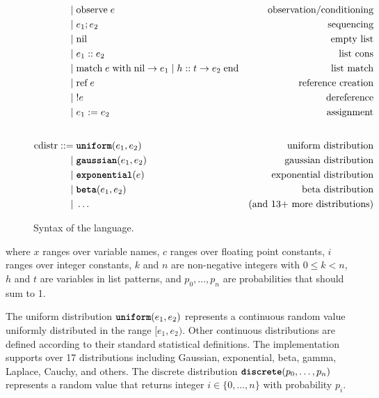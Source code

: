 \documentclass[acmsmall,screen,dvipsnames,x11names,nonacm,anonymous,review]{acmart}
\begin{document}
\begin{figure}[h]
\begin{align*}
    | &\; \text{observe}\; e              & \text{observation/conditioning} \\
    | &\; e_1; e_2                        & \text{sequencing} \\
    | &\; \text{nil}                      & \text{empty list} \\
    | &\; e_1 :: e_2                      & \text{list cons} \\
    | &\; \text{match}\; e\; \text{with}\; \text{nil} \rightarrow e_1 \mid h :: t \rightarrow e_2\; \text{end} & \text{list match} \\
    | &\; \text{ref}\; e                  & \text{reference creation} \\
    | &\; !e                              & \text{dereference} \\
    | &\; e_1 := e_2                      & \text{assignment} \\
    \\[1ex] %
\text{cdistr} ::= &\; \uniform(e_1, e_2)      & \text{uniform distribution} \\
           | &\; \gaussian(e_1, e_2)   & \text{gaussian distribution} \\
           | &\; \exponential(e)       & \text{exponential distribution} \\
           | &\; \betafn(e_1, e_2)     & \text{beta distribution} \\
           | &\; \ldots                & \text{(and 13+ more distributions)}
\end{align*}
\caption{Syntax of the \Slice{} language.}
\label{fig:grammar}
\end{figure}

\noindent where $x$ ranges over variable names, $c$ ranges over floating point constants, $i$ ranges over integer constants, $k$ and $n$ are non-negative integers with $0 \leq k < n$, $h$ and $t$ are variables in list patterns, and $p_0, \ldots, p_n$ are probabilities that should sum to 1.

The uniform distribution $\text{\ttfamily\bfseries uniform}(e_1, e_2)$ represents a continuous random value uniformly distributed in the range $[e_1, e_2)$. Other continuous distributions are defined according to their standard statistical definitions. The implementation supports over 17 distributions including Gaussian, exponential, beta, gamma, Laplace, Cauchy, and others. The discrete distribution $\text{\ttfamily\bfseries discrete}(p_0, \ldots, p_{n})$ represents a random value that returns integer $i \in \{0, \ldots, n\}$ with probability $p_i$.
\end{document}
